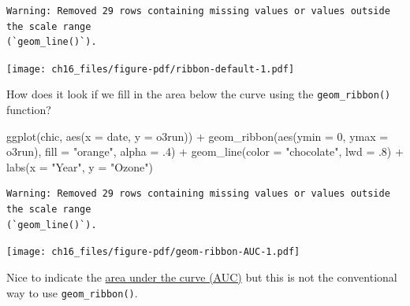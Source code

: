 \documentclass[
  letterpaper,
]{scrbook}
\newenvironment{Shaded}{\begin{snugshade}}{\end{snugshade}}
\newcommand{\AttributeTok}[1]{\textcolor[rgb]{0.40,0.45,0.13}{#1}}
\newcommand{\DecValTok}[1]{\textcolor[rgb]{0.68,0.00,0.00}{#1}}
\newcommand{\FunctionTok}[1]{\textcolor[rgb]{0.28,0.35,0.67}{#1}}
\newcommand{\NormalTok}[1]{\textcolor[rgb]{0.00,0.23,0.31}{#1}}
\newcommand{\SpecialCharTok}[1]{\textcolor[rgb]{0.37,0.37,0.37}{#1}}
\newcommand{\StringTok}[1]{\textcolor[rgb]{0.13,0.47,0.30}{#1}}
\begin{document}
\begin{verbatim}
Warning: Removed 29 rows containing missing values or values outside the scale range
(`geom_line()`).
\end{verbatim}

\texttt{[image: ch16\_files/figure-pdf/ribbon-default-1.pdf]}

How does it look if we fill in the area below the curve using the
\texttt{geom\_ribbon()} function?

\begin{Shaded}
\begin{Highlighting}[]
\FunctionTok{ggplot}\NormalTok{(chic, }\FunctionTok{aes}\NormalTok{(}\AttributeTok{x =}\NormalTok{ date, }\AttributeTok{y =}\NormalTok{ o3run)) }\SpecialCharTok{+}
   \FunctionTok{geom\_ribbon}\NormalTok{(}\FunctionTok{aes}\NormalTok{(}\AttributeTok{ymin =} \DecValTok{0}\NormalTok{, }\AttributeTok{ymax =}\NormalTok{ o3run),}
               \AttributeTok{fill =} \StringTok{"orange"}\NormalTok{, }\AttributeTok{alpha =}\NormalTok{ .}\DecValTok{4}\NormalTok{) }\SpecialCharTok{+}
   \FunctionTok{geom\_line}\NormalTok{(}\AttributeTok{color =} \StringTok{"chocolate"}\NormalTok{, }\AttributeTok{lwd =}\NormalTok{ .}\DecValTok{8}\NormalTok{) }\SpecialCharTok{+}
   \FunctionTok{labs}\NormalTok{(}\AttributeTok{x =} \StringTok{"Year"}\NormalTok{, }\AttributeTok{y =} \StringTok{"Ozone"}\NormalTok{)}
\end{Highlighting}
\end{Shaded}

\begin{verbatim}
Warning: Removed 29 rows containing missing values or values outside the scale range
(`geom_line()`).
\end{verbatim}

\texttt{[image: ch16\_files/figure-pdf/geom-ribbon-AUC-1.pdf]}

Nice to indicate the
\href{https://en.wikipedia.org/wiki/Area_under_the_curve_(pharmacokinetics)}{area
under the curve (AUC)} but this is not the conventional way to use
\texttt{geom\_ribbon()}.
\end{document}

